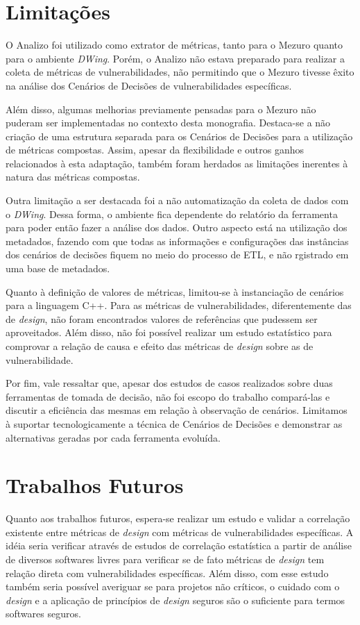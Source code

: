 \section{Limitações}

O Analizo foi utilizado como extrator de métricas, tanto para o Mezuro quanto para o ambiente \emph{DWing}. Porém, o Analizo não estava preparado para realizar a coleta de métricas de vulnerabilidades, não permitindo que o Mezuro tivesse êxito na análise dos Cenários de Decisões de vulnerabilidades específicas. 

Além disso, algumas melhorias previamente pensadas para o Mezuro não puderam ser implementadas no contexto desta monografia. Destaca-se a não criação de uma estrutura separada para os Cenários de Decisões para a utilização de métricas compostas. Assim, apesar da flexibilidade e outros ganhos relacionados à esta adaptação, também foram herdados as limitações inerentes à natura das métricas compostas.

Outra limitação a ser destacada foi a não automatização da coleta de dados com o \emph{DWing}. Dessa forma, o ambiente fica dependente do relatório da ferramenta para poder então fazer a análise dos dados. Outro aspecto está na utilização dos metadados, fazendo com que todas as informações e configurações das instâncias dos cenários de decisões fiquem no meio do processo de ETL, e não rgistrado em uma base de metadados.

Quanto à definição de valores de métricas, limitou-se à instanciação de cenários para a linguagem C++. Para as métricas de vulnerabilidades, diferentemente das de \emph{design}, não foram encontrados valores de referências que pudessem ser aproveitados. Além disso, não foi possível realizar um estudo estatístico para comprovar a relação de causa e efeito das métricas de \emph{design} sobre as de vulnerabilidade.

Por fim, vale ressaltar que, apesar dos estudos de casos realizados sobre duas ferramentas de tomada de decisão, não foi escopo do trabalho compará-las e discutir a eficiência das mesmas em relação à observação de cenários. Limitamos à suportar tecnologicamente a técnica de Cenários de Decisões e demonstrar as alternativas geradas por cada ferramenta evoluída.

\section{Trabalhos Futuros}

Quanto aos trabalhos futuros, espera-se realizar um estudo e validar a correlação existente entre métricas de \emph{design} com métricas de vulnerabilidades específicas. A idéia seria verificar através de estudos de correlação estatística a partir de análise de diversos softwares livres para verificar se de fato métricas de \emph{design} tem relação direta com vulnerabilidades específicas. Além disso, com esse estudo também seria possível averiguar se para projetos não críticos, o cuidado com o \emph{design} e a aplicação de princípios de \emph{design} seguros são o suficiente para termos softwares seguros. 

